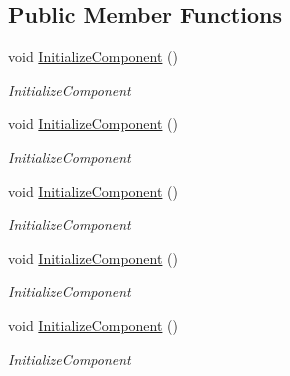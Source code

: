 \subsection*{Public Member Functions}
\begin{DoxyCompactItemize}
\item 
void \mbox{\hyperlink{class_teacher_handbook_1_1_main_window_a5c88103977c278c6c7fc73b06de160d0}{Initialize\+Component}} ()
\begin{DoxyCompactList}\small\item\em Initialize\+Component \end{DoxyCompactList}\item 
void \mbox{\hyperlink{class_teacher_handbook_1_1_main_window_a5c88103977c278c6c7fc73b06de160d0}{Initialize\+Component}} ()
\begin{DoxyCompactList}\small\item\em Initialize\+Component \end{DoxyCompactList}\item 
void \mbox{\hyperlink{class_teacher_handbook_1_1_main_window_a5c88103977c278c6c7fc73b06de160d0}{Initialize\+Component}} ()
\begin{DoxyCompactList}\small\item\em Initialize\+Component \end{DoxyCompactList}\item 
void \mbox{\hyperlink{class_teacher_handbook_1_1_main_window_a5c88103977c278c6c7fc73b06de160d0}{Initialize\+Component}} ()
\begin{DoxyCompactList}\small\item\em Initialize\+Component \end{DoxyCompactList}\item 
void \mbox{\hyperlink{class_teacher_handbook_1_1_main_window_a5c88103977c278c6c7fc73b06de160d0}{Initialize\+Component}} ()
\begin{DoxyCompactList}\small\item\em Initialize\+Component \end{DoxyCompactList}\end{DoxyCompactItemize}
